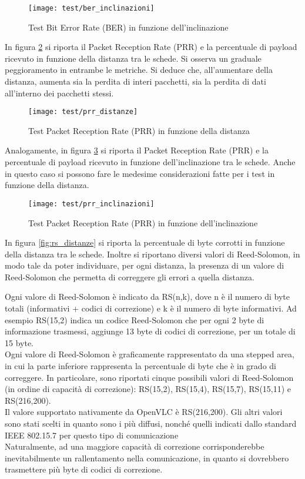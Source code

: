 \begin{figure}[H] 
    \centering 
    \texttt{[image: test/ber\_inclinazioni]} 
    \caption{Test Bit Error Rate (BER) in funzione dell'inclinazione}
    \label{fig:ber_inclinazioni}
\end{figure}

In figura \ref{fig:prr_distanze} si riporta il Packet Reception Rate (PRR) e la percentuale di payload ricevuto in funzione della distanza tra le schede. Si osserva un graduale peggioramento in entrambe le metriche. Si deduce che, all'aumentare della distanza, aumenta sia la perdita di interi pacchetti, sia la perdita di dati all'interno dei pacchetti stessi. 

\begin{figure}[H] 
    \centering 
    \texttt{[image: test/prr\_distanze]} 
    \caption{Test Packet Reception Rate (PRR) in funzione della distanza}
    \label{fig:prr_distanze}
\end{figure}

Analogamente, in figura \ref{fig:prr_inclinazioni} si riporta il Packet Reception Rate (PRR) e la percentuale di payload ricevuto in funzione dell'inclinazione tra le schede. Anche in questo caso si possono fare le medesime considerazioni fatte per i test in funzione della distanza.

\begin{figure}[H] 
    \centering 
    \texttt{[image: test/prr\_inclinazioni]} 
    \caption{Test Packet Reception Rate (PRR) in funzione dell'inclinazione}
    \label{fig:prr_inclinazioni}
\end{figure}

In figura \ref{fig:rs_distanze} si riporta la percentuale di byte corrotti in funzione della distanza tra le schede. Inoltre si riportano diversi valori di Reed-Solomon, in modo tale da poter individuare, per ogni distanza, la presenza di un valore di Reed-Solomon che permetta di correggere gli errori a quella distanza.

Ogni valore di Reed-Solomon è indicato da RS(n,k), dove n è il numero di byte totali (informativi + codici di correzione) e k è il numero di byte informativi. Ad esempio RS(15,2) indica un codice Reed-Solomon che per ogni 2 byte di informazione trasmessi, aggiunge 13 byte di codici di correzione, per un totale di 15 byte.\\
Ogni valore di Reed-Solomon è graficamente rappresentato da una stepped area, in cui la parte inferiore rappresenta la percentuale di byte che è in grado di correggere. In particolare, sono riportati cinque possibili valori di Reed-Solomon (in ordine di capacità di correzione): RS(15,2), RS(15,4), RS(15,7), RS(15,11) e RS(216,200).\\
Il valore supportato nativamente da OpenVLC è RS(216,200). Gli altri valori sono stati scelti in quanto sono i più diffusi, nonché quelli indicati dallo standard IEEE 802.15.7 per questo tipo di comunicazione\\
Naturalmente, ad una maggiore capacità di correzione corrisponderebbe inevitabilmente un rallentamento nella comunicazione, in quanto si dovrebbero trasmettere più byte di codici di correzione.

